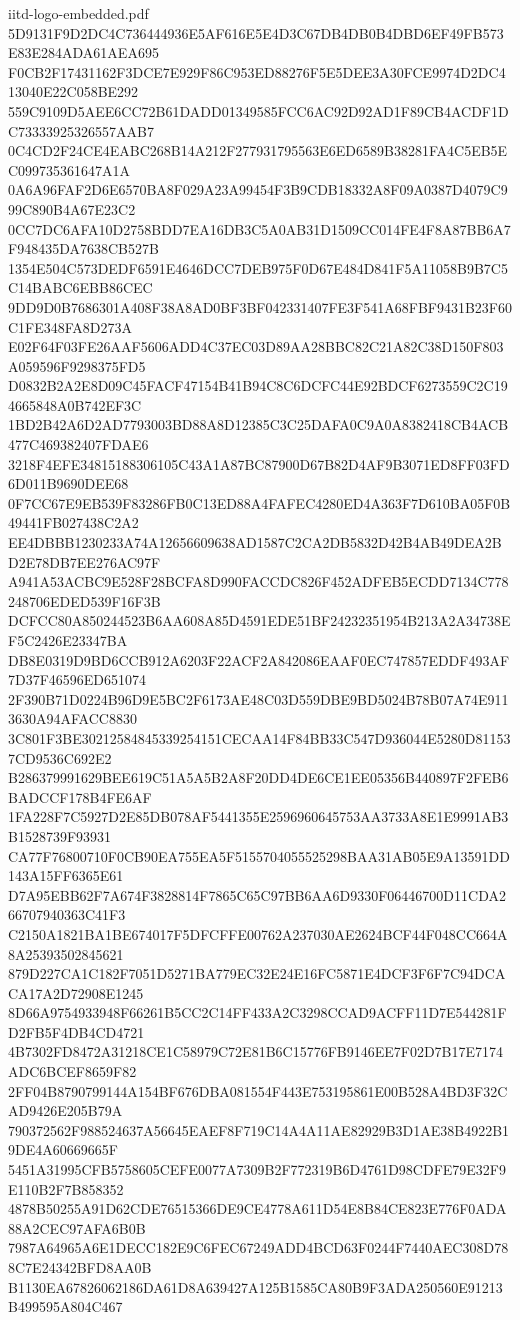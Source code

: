\begin{filecontents*}[overwrite]{iitd-logo-embedded.pdf}
5D9131F9D2DC4C736444936E5AF616E5E4D3C67DB4DB0B4DBD6EF49FB573E83E284ADA61AEA695
F0CB2F17431162F3DCE7E929F86C953ED88276F5E5DEE3A30FCE9974D2DC413040E22C058BE292
559C9109D5AEE6CC72B61DADD01349585FCC6AC92D92AD1F89CB4ACDF1DC73333925326557AAB7
0C4CD2F24CE4EABC268B14A212F277931795563E6ED6589B38281FA4C5EB5EC099735361647A1A
0A6A96FAF2D6E6570BA8F029A23A99454F3B9CDB18332A8F09A0387D4079C999C890B4A67E23C2
0CC7DC6AFA10D2758BDD7EA16DB3C5A0AB31D1509CC014FE4F8A87BB6A7F948435DA7638CB527B
1354E504C573DEDF6591E4646DCC7DEB975F0D67E484D841F5A11058B9B7C5C14BABC6EBB86CEC
9DD9D0B7686301A408F38A8AD0BF3BF042331407FE3F541A68FBF9431B23F60C1FE348FA8D273A
E02F64F03FE26AAF5606ADD4C37EC03D89AA28BBC82C21A82C38D150F803A059596F9298375FD5
D0832B2A2E8D09C45FACF47154B41B94C8C6DCFC44E92BDCF6273559C2C194665848A0B742EF3C
1BD2B42A6D2AD7793003BD88A8D12385C3C25DAFA0C9A0A8382418CB4ACB477C469382407FDAE6
3218F4EFE34815188306105C43A1A87BC87900D67B82D4AF9B3071ED8FF03FD6D011B9690DEE68
0F7CC67E9EB539F83286FB0C13ED88A4FAFEC4280ED4A363F7D610BA05F0B49441FB027438C2A2
EE4DBBB1230233A74A12656609638AD1587C2CA2DB5832D42B4AB49DEA2BD2E78DB7EE276AC97F
A941A53ACBC9E528F28BCFA8D990FACCDC826F452ADFEB5ECDD7134C778248706EDED539F16F3B
DCFCC80A850244523B6AA608A85D4591EDE51BF24232351954B213A2A34738EF5C2426E23347BA
DB8E0319D9BD6CCB912A6203F22ACF2A842086EAAF0EC747857EDDF493AF7D37F46596ED651074
2F390B71D0224B96D9E5BC2F6173AE48C03D559DBE9BD5024B78B07A74E9113630A94AFACC8830
3C801F3BE30212584845339254151CECAA14F84BB33C547D936044E5280D811537CD9536C692E2
B286379991629BEE619C51A5A5B2A8F20DD4DE6CE1EE05356B440897F2FEB6BADCCF178B4FE6AF
1FA228F7C5927D2E85DB078AF5441355E2596960645753AA3733A8E1E9991AB3B1528739F93931
CA77F76800710F0CB90EA755EA5F5155704055525298BAA31AB05E9A13591DD143A15FF6365E61
D7A95EBB62F7A674F3828814F7865C65C97BB6AA6D9330F06446700D11CDA266707940363C41F3
C2150A1821BA1BE674017F5DFCFFE00762A237030AE2624BCF44F048CC664A8A25393502845621
879D227CA1C182F7051D5271BA779EC32E24E16FC5871E4DCF3F6F7C94DCACA17A2D72908E1245
8D66A9754933948F66261B5CC2C14FF433A2C3298CCAD9ACFF11D7E544281FD2FB5F4DB4CD4721
4B7302FD8472A31218CE1C58979C72E81B6C15776FB9146EE7F02D7B17E7174ADC6BCEF8659F82
2FF04B8790799144A154BF676DBA081554F443E753195861E00B528A4BD3F32CAD9426E205B79A
790372562F988524637A56645EAEF8F719C14A4A11AE82929B3D1AE38B4922B19DE4A60669665F
5451A31995CFB5758605CEFE0077A7309B2F772319B6D4761D98CDFE79E32F9E110B2F7B858352
4878B50255A91D62CDE76515366DE9CE4778A611D54E8B84CE823E776F0ADA88A2CEC97AFA6B0B
7987A64965A6E1DECC182E9C6FEC67249ADD4BCD63F0244F7440AEC308D788C7E24342BFD8AA0B
B1130EA67826062186DA61D8A639427A125B1585CA80B9F3ADA250560E91213B499595A804C467

\end{filecontents*}
